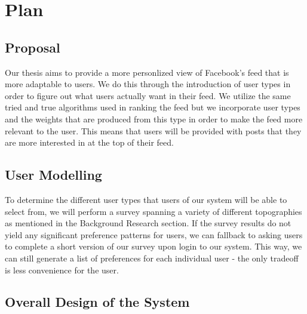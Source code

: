 
\chapter{Plan}\label{ch:plan}

\section{Proposal}

Our thesis aims to provide a more personlized view of Facebook's feed that is more adaptable to users. We do this through the introduction of user types in order to figure out what users actually want in their feed. We utilize the same tried and true algorithms used in ranking the feed but we incorporate user types and the weights that are produced from this type in order to make the feed more relevant to the user. This means that users will be provided with posts that they are more interested in at the top of their feed. 

\section{User Modelling}

To determine the different user types that users of our system will be able to select from, we will perform a survey spanning a variety of different topographies as mentioned in the Background Research section. If the survey results do not yield any significant preference patterns for users, we can fallback to asking users to complete a short version of our survey upon login to our system. This way, we can still generate a list of preferences for each individual user - the only tradeoff is less convenience for the user.

\section{Overall Design of the System}

